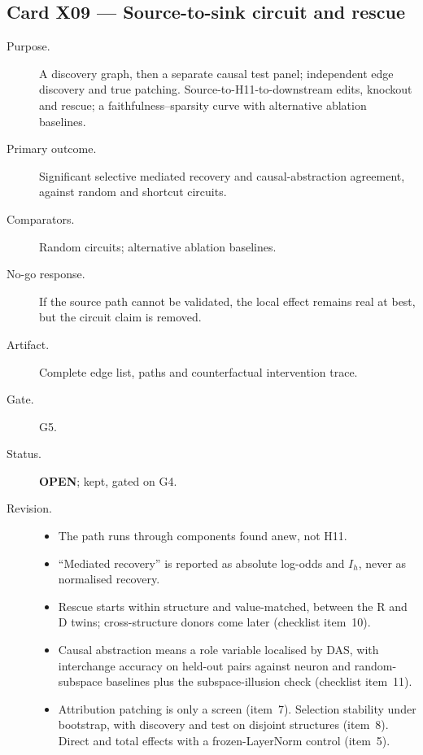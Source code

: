 \documentclass[10pt,a4paper]{article}
\begin{document}
\subsection{Card X09 --- Source-to-sink circuit and rescue}
\label{card:X09}
\begin{description}
\item[Purpose.] A discovery graph, then a separate causal test panel; independent edge discovery and true
patching. Source-to-H11-to-downstream edits, knockout and rescue; a faithfulness--sparsity curve with alternative
ablation baselines.
\item[Primary outcome.] Significant selective mediated recovery and causal-abstraction agreement, against random
and shortcut circuits.
\item[Comparators.] Random circuits; alternative ablation baselines.
\item[No-go response.] If the source path cannot be validated, the local effect remains real at best, but the
circuit claim is removed.
\item[Artifact.] Complete edge list, paths and counterfactual intervention trace.
\item[Gate.] G5.
\item[Status.] \textbf{OPEN}; kept, gated on G4.
\item[Revision.]
\begin{itemize}
\item The path runs through components found anew, not H11.
\item ``Mediated recovery'' is reported as absolute log-odds and $I_h$, never as normalised recovery.
\item Rescue starts within structure and value-matched, between the R and D twins; cross-structure donors come
later (checklist item~10).
\item Causal abstraction means a role variable localised by DAS, with interchange accuracy on held-out pairs
against neuron and random-subspace baselines plus the subspace-illusion check (checklist item~11).
\item Attribution patching is only a screen (item~7). Selection stability under bootstrap, with discovery and test
on disjoint structures (item~8). Direct and total effects with a frozen-LayerNorm control (item~5).
\end{itemize}
\end{description}

\end{document}
